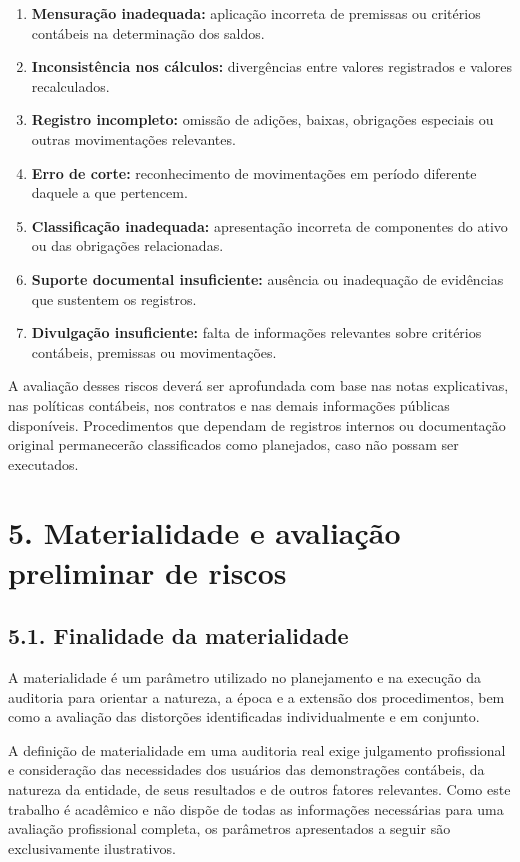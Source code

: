 \documentclass[
]{article}
\providecommand{\tightlist}{%
  \setlength{\itemsep}{0pt}\setlength{\parskip}{0pt}}
\begin{document}
\begin{enumerate}
\def\labelenumi{\arabic{enumi}.}
\tightlist
\item
  \textbf{Mensuração inadequada:} aplicação incorreta de premissas ou
  critérios contábeis na determinação dos saldos.
\item
  \textbf{Inconsistência nos cálculos:} divergências entre valores
  registrados e valores recalculados.
\item
  \textbf{Registro incompleto:} omissão de adições, baixas, obrigações
  especiais ou outras movimentações relevantes.
\item
  \textbf{Erro de corte:} reconhecimento de movimentações em período
  diferente daquele a que pertencem.
\item
  \textbf{Classificação inadequada:} apresentação incorreta de
  componentes do ativo ou das obrigações relacionadas.
\item
  \textbf{Suporte documental insuficiente:} ausência ou inadequação de
  evidências que sustentem os registros.
\item
  \textbf{Divulgação insuficiente:} falta de informações relevantes
  sobre critérios contábeis, premissas ou movimentações.
\end{enumerate}

A avaliação desses riscos deverá ser aprofundada com base nas notas
explicativas, nas políticas contábeis, nos contratos e nas demais
informações públicas disponíveis. Procedimentos que dependam de
registros internos ou documentação original permanecerão classificados
como planejados, caso não possam ser executados.

\section{5. Materialidade e avaliação preliminar de
riscos}\label{materialidade-e-avaliauxe7uxe3o-preliminar-de-riscos}

\subsection{5.1. Finalidade da
materialidade}\label{finalidade-da-materialidade}

A materialidade é um parâmetro utilizado no planejamento e na execução
da auditoria para orientar a natureza, a época e a extensão dos
procedimentos, bem como a avaliação das distorções identificadas
individualmente e em conjunto.

A definição de materialidade em uma auditoria real exige julgamento
profissional e consideração das necessidades dos usuários das
demonstrações contábeis, da natureza da entidade, de seus resultados e
de outros fatores relevantes. Como este trabalho é acadêmico e não
dispõe de todas as informações necessárias para uma avaliação
profissional completa, os parâmetros apresentados a seguir são
exclusivamente ilustrativos.
\end{document}
